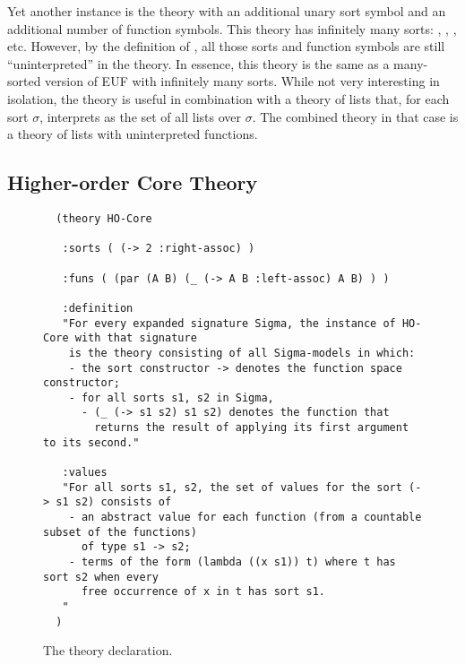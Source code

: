 Yet another instance is the theory with an additional unary sort symbol 
and an additional number of function symbols.
This theory has infinitely many sorts:
, ,  , etc.
However, by the definition of ,
all those sorts and function symbols are still ``uninterpreted'' in the theory.
In essence, 
this theory is the same as a many-sorted version of EUF with infinitely many sorts.
While not very interesting in isolation,
the theory is useful in combination with a theory of lists that,
for each sort $\sigma$, 
interprets  as the set of all lists over $\sigma$.
The combined theory in that case is a theory of lists with uninterpreted
functions.

\begin{newver} 

\section{Higher-order Core Theory}
\label{sec:ho-core}

\begin{figure}[t]
  \small
  {\color{NavyBlue}
  \begin{verbatim}
  (theory HO-Core
  
   :sorts ( (-> 2 :right-assoc) )
  
   :funs ( (par (A B) (_ (-> A B :left-assoc) A B) ) )
  
   :definition
   "For every expanded signature Sigma, the instance of HO-Core with that signature
    is the theory consisting of all Sigma-models in which: 
    - the sort constructor -> denotes the function space constructor;
    - for all sorts s1, s2 in Sigma, 
      - (_ (-> s1 s2) s1 s2) denotes the function that
        returns the result of applying its first argument to its second."
    
   :values 
   "For all sorts s1, s2, the set of values for the sort (-> s1 s2) consists of
    - an abstract value for each function (from a countable subset of the functions)
      of type s1 -> s2;
    - terms of the form (lambda ((x s1)) t) where t has sort s2 when every
      free occurrence of x in t has sort s1.
   " 
  )
  \end{verbatim}
  }%
  \caption{The  theory declaration.}
  \label{fig:HO-Core}
  \end{figure}
  


\end{newver}
